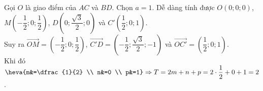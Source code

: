 \begin{bt}
{\begin{center}
		\end{center}
		Gọi  $O$ là giao điểm của $AC$ và $BD$. Chọn $a=1$.
		Dễ dàng  tính được $O\left(0;0;0\right)$, $M\left(-\dfrac{1}{2};0;\dfrac{1}{2} \right)$, $D\left(0;\dfrac{\sqrt{3}}{2};0\right)$ và $C'\left(\dfrac{1}{2};0;1\right)$.\\
		Suy ra $\overrightarrow{OM}=\left(-\dfrac{1}{2};0;\dfrac{1}{2} \right)$, $\overrightarrow{C'D}=\left(-\dfrac{1}{2};\dfrac{\sqrt{3}}{2};-1\right)$ và $\overrightarrow{OC'}=\left(\dfrac{1}{2};0;1\right)$.\\ 
		Khi đó $\heva{m&=\dfrac{1}{2} \\ n&=0 \\ p&=1} \Rightarrow T=2m+n+p=2\cdot  \dfrac{1}{2}+0+1=2$.
	} 
\end{bt}

